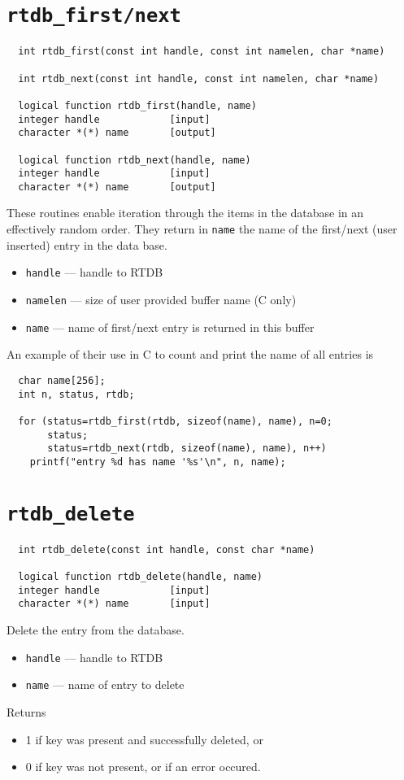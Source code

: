 \section{{\tt rtdb\_first/next}}
\begin{verbatim}
  int rtdb_first(const int handle, const int namelen, char *name)

  int rtdb_next(const int handle, const int namelen, char *name)

  logical function rtdb_first(handle, name)
  integer handle            [input]
  character *(*) name       [output]

  logical function rtdb_next(handle, name)
  integer handle            [input]
  character *(*) name       [output]
\end{verbatim}
These routines enable iteration through the items in the database in
an effectively random order.  They return in {\tt name} the name of
the first/next (user inserted) entry in the data base. 
\begin{itemize}
\item {\tt handle} --- handle to RTDB
\item {\tt namelen} ---  size of user provided buffer name (C only)
\item {\tt name} --- name of first/next entry is returned in this
  buffer
\end{itemize}

An example of their use in C to count and print the name of all
entries is
\begin{verbatim}
  char name[256];
  int n, status, rtdb;

  for (status=rtdb_first(rtdb, sizeof(name), name), n=0;
       status;
       status=rtdb_next(rtdb, sizeof(name), name), n++) 
    printf("entry %d has name '%s'\n", n, name);
\end{verbatim}

\section{{\tt rtdb\_delete}}
\begin{verbatim}
  int rtdb_delete(const int handle, const char *name)

  logical function rtdb_delete(handle, name)
  integer handle            [input]
  character *(*) name       [input]
\end{verbatim}
Delete the entry from the database. 
\begin{itemize}
\item {\tt handle} --- handle to RTDB
\item {\tt name} --- name of entry to delete
\end{itemize}
Returns
\begin{itemize}
\item 1 if key was present and successfully deleted, or
\item 0 if key was not present, or if an error occured.
\end{itemize}

